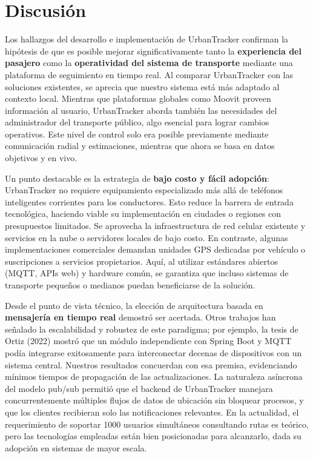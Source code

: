 \section{Discusión}
Los hallazgos del desarrollo e implementación de UrbanTracker confirman la hipótesis de que es posible mejorar significativamente tanto la \textbf{experiencia del pasajero} como la \textbf{operatividad del sistema de transporte} mediante una plataforma de seguimiento en tiempo real. Al comparar UrbanTracker con las soluciones existentes, se aprecia que nuestro sistema está más adaptado al contexto local. Mientras que plataformas globales como Moovit proveen información al usuario, UrbanTracker aborda también las necesidades del administrador del transporte público, algo esencial para lograr cambios operativos. Este nivel de control solo era posible previamente mediante comunicación radial y estimaciones, mientras que ahora se basa en datos objetivos y en vivo.

Un punto destacable es la estrategia de \textbf{bajo costo y fácil adopción}: UrbanTracker no requiere equipamiento especializado más allá de teléfonos inteligentes corrientes para los conductores. Esto reduce la barrera de entrada tecnológica, haciendo viable su implementación en ciudades o regiones con presupuestos limitados. Se aprovecha la infraestructura de red celular existente y servicios en la nube o servidores locales de bajo costo. En contraste, algunas implementaciones comerciales demandan unidades GPS dedicadas por vehículo o suscripciones a servicios propietarios. Aquí, al utilizar estándares abiertos (MQTT, APIs web) y hardware común, se garantiza que incluso sistemas de transporte pequeños o medianos puedan beneficiarse de la solución.

Desde el punto de vista técnico, la elección de arquitectura basada en \textbf{mensajería en tiempo real} demostró ser acertada. Otros trabajos han señalado la escalabilidad y robustez de este paradigma; por ejemplo, la tesis de Ortiz (2022) mostró que un módulo independiente con Spring Boot y MQTT podía integrarse exitosamente para interconectar decenas de dispositivos con un sistema central\cite{ortiz2022smolcomm}. Nuestros resultados concuerdan con esa premisa, evidenciando mínimos tiempos de propagación de las actualizaciones. La naturaleza asíncrona del modelo pub/sub permitió que el backend de UrbanTracker manejara concurrentemente múltiples flujos de datos de ubicación sin bloquear procesos, y que los clientes recibieran solo las notificaciones relevantes. En la actualidad, el requerimiento de soportar 1000 usuarios simultáneos consultando rutas es teórico, pero las tecnologías empleadas están bien posicionadas para alcanzarlo, dada su adopción en sistemas de mayor escala.

